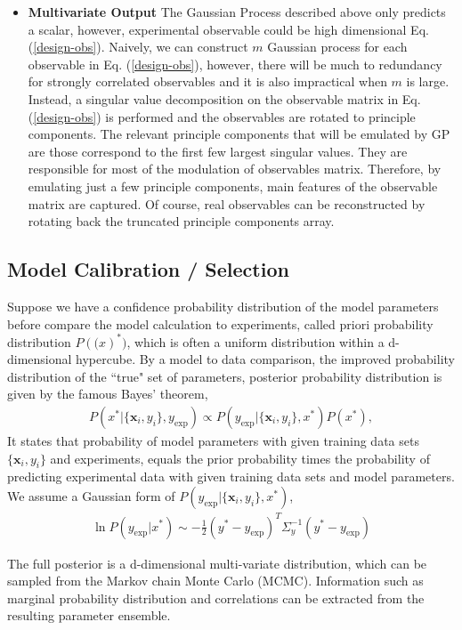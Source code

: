 \documentclass[aps,prl,twocolumn,groupedaddress]{revtex4-1}
\begin{document}
\begin{itemize}
	\item{\bf Multivariate Output}
	The Gaussian Process described above only predicts a scalar, however, experimental observable could be high dimensional Eq. (\ref{design-obs}). Naively, we can construct $m$ Gaussian process for each observable in Eq. (\ref{design-obs}), however, there will be much to redundancy for strongly correlated observables and it is also impractical when $m$ is large. Instead, a singular value decomposition on the observable matrix in Eq. (\ref{design-obs}) is performed and the observables are rotated to principle components. The relevant principle components that will be emulated by GP are those correspond to the first few largest singular values. They are responsible for most of the modulation of observables matrix. Therefore, by emulating just a few principle components, main features of the observable matrix are captured. Of course, real observables can be reconstructed by rotating back the truncated principle components array.
	\end{itemize}
	
	\subsection{Model Calibration / Selection}
	Suppose we have a confidence probability distribution of the model parameters before compare the model calculation to experiments, called priori probability distribution $P(\mathbf(x)^*)$, which is often a uniform distribution within a d-dimensional hypercube. 
	By a model to data comparison, the improved probability distribution of the ``true" set of parameters, posterior probability distribution is given by the famous Bayes' theorem,
	\begin{eqnarray}
		P(x^*|\{\mathbf{x}_i, y_i\}, y_\textrm{exp}) \propto P(y_\textrm{exp}|\{\mathbf{x}_i, y_i\}, x^*) P(x^*),
	\end{eqnarray}
	It states that probability of model parameters with given training data sets $\{\mathbf{x}_i, y_i\}$ and experiments, equals the prior probability times the probability of predicting experimental data with given training data sets and model parameters.
	We assume a Gaussian form of $P(y_\textrm{exp}|\{\mathbf{x}_i, y_i\}, x^*)$,
	\begin{eqnarray}
	\ln P(y_\textrm{exp}|x^*) \sim -\frac{1}{2}(y^* - y_\textrm{exp})^T\Sigma_y^{-1}(y^* - y_\textrm{exp})
	\end{eqnarray}
	
The full posterior is a d-dimensional multi-variate distribution, which can be sampled from the Markov chain Monte Carlo (MCMC). Information such as marginal probability distribution and correlations can be extracted from the resulting parameter ensemble.
	
\end{document}
